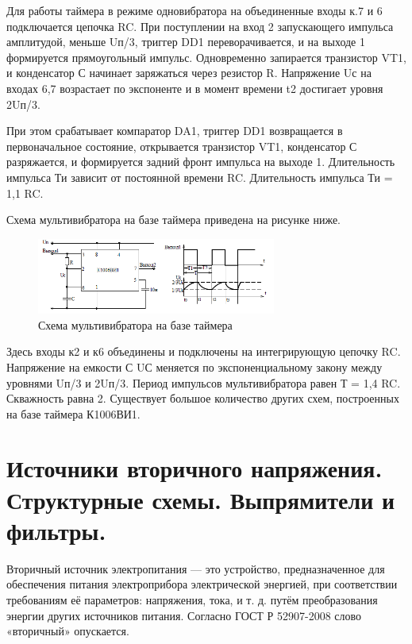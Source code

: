 \documentclass[unicode, 12pt, a4paper, oneside]{article}
\begin{document}
Для работы таймера в режиме одновибратора на объединенные входы к.7 и 6 подключается цепочка RC. При поступлении на вход 2 запускающего импульса амплитудой, меньше Uп/3, триггер DD1 переворачивается, и на выходе 1 формируется прямоугольный импульс. Одновременно запирается транзистор VT1, и конденсатор С начинает заряжаться через резистор R. Напряжение Uс на входах 6,7 возрастает по экспоненте и в момент времени t2 достигает уровня 2Uп/3.

При этом срабатывает компаратор DA1, триггер DD1 возвращается в первоначальное состояние, открывается транзистор VT1, конденсатор С разряжается, и формируется задний фронт импульса на выходе 1. Длительность импульса Ти зависит от постоянной времени RC. Длительность импульса Ти = 1,1 RC.

Схема мультивибратора на базе таймера приведена на рисунке ниже.

\begin{figure}[H]
\centering
\includegraphics[width=0.7\textwidth]{18_mdiag.png}
\caption{Схема мультивибратора на базе таймера}
\label{fig:18_mdiag}
\end{figure}

Здесь входы к2 и к6 объединены и подключены на интегрирующую цепочку RC. Напряжение на емкости С UС меняется по экспоненциальному закону между уровнями Uп/3 и 2Uп/3. Период импульсов мультивибратора равен Т = 1,4 RC. Скважность равна 2.
Существует большое количество других схем, построенных на базе таймера К1006ВИ1.


\section{Источники вторичного напряжения. Структурные схемы. Выпрямители и фильтры.}

Вторичный источник электропитания — это устройство, предназначенное для обеспечения питания электроприбора электрической энергией, при соответствии требованиям её параметров: напряжения, тока, и т. д. путём преобразования энергии других источников питания. Согласно ГОСТ Р 52907-2008 слово «вторичный» опускается.
\end{document}
